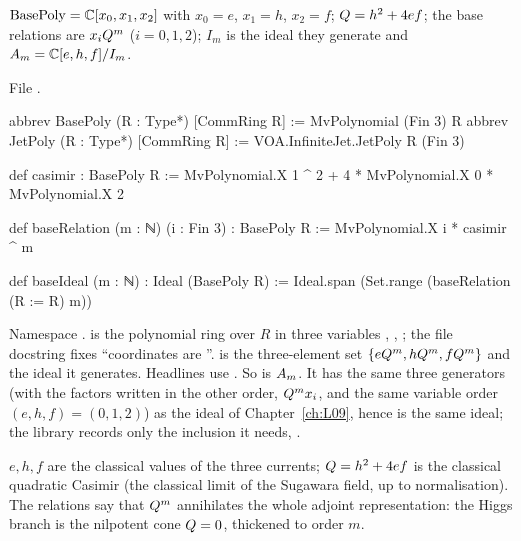\begin{definition}\label{l20:def:base}
$\mathrm{BasePoly}={\mathbb{C}}[x_0,x_1,x_2]$ with $x_0=e$, $x_1=h$, $x_2=f$; $Q=h^2+4ef$; the base relations
are $x_iQ^m$ ($i=0,1,2$); $I_m$ is the ideal they generate and $A_m={\mathbb{C}}[e,h,f]/I_m$.
\end{definition}
\noindent File .
\begin{leancode}
abbrev BasePoly (R : Type*) [CommRing R] := MvPolynomial (Fin 3) R
abbrev JetPoly (R : Type*) [CommRing R] := VOA.InfiniteJet.JetPoly R (Fin 3)

def casimir : BasePoly R := MvPolynomial.X 1 ^ 2 + 4 * MvPolynomial.X 0 * MvPolynomial.X 2

def baseRelation (m : ℕ) (i : Fin 3) : BasePoly R := MvPolynomial.X i * casimir ^ m

def baseIdeal (m : ℕ) : Ideal (BasePoly R) := Ideal.span (Set.range (baseRelation (R := R) m))
\end{leancode}

\begin{dictionary}
Namespace .  is the polynomial ring over $R$ in
three variables , , ; the file docstring fixes ``coordinates are
''.  is the three-element set
$\{eQ^m,hQ^m,fQ^m\}$ and  the ideal it generates. Headlines use
. So  is $A_m$. It has the same three generators (with the factors
written in the other order, $Q^m x_i$, and the same variable order $(e,h,f)=(0,1,2)$) as the ideal
 of Chapter~\ref{ch:L09}, hence is the same ideal; the library records only the
inclusion it needs, .
\end{dictionary}

\begin{physics}
$e,h,f$ are the classical values of the three currents; $Q=h^2+4ef$ is the classical quadratic
Casimir (the classical limit of the Sugawara field, up to normalisation). The relations say that
$Q^m$ annihilates the whole adjoint representation: the Higgs branch is the nilpotent cone
$Q=0$, thickened to order $m$.
\end{physics}


